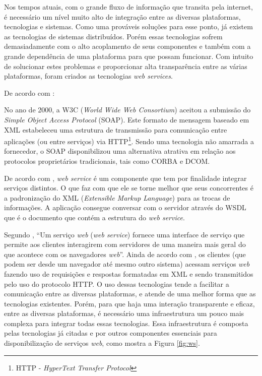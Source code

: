 	
	\par Nos tempos atuais, com o grande fluxo de informação que transita pela
internet, é necessário um nível muito alto de integração entre as diversas
plataformas, tecnologias e sistemas. Como uma prováveis soluções para esse
ponto, já existem as tecnologias de sistemas distribuídos. Porém essas tecnologias
sofrem demasiadamente com o alto acoplamento de seus componentes e também com a
grande dependência de uma plataforma para que possam funcionar. Com intuito de
solucionar estes problemas e proporcionar alta transparência entre as várias
plataformas, foram criados as tecnologias \textit{web services}.
	
	
	\par De acordo com :
	\begin{citacao}
		No ano de 2000, a W3C (\textit{World Wide Web Consortium}) aceitou a submissão
		do \textit{Simple Object Access Protocol} (SOAP). Este formato de mensagem
		baseado em XML estabeleceu uma estrutura de transmissão para comunicação entre
		aplicações (ou entre serviços) via HTTP\footnote{HTTP - \textit{HyperText
		Transfer Protocol}}. Sendo uma tecnologia não amarrada a fornecedor, o SOAP
		disponibilizou uma alternativa atrativa em relação aos protocolos
		proprietários tradicionais, tais como CORBA e DCOM.
	\end{citacao}
	
	\par De acordo com , \textit{web service} é um
componente que tem por finalidade integrar serviços distintos. O que faz com
que ele se torne melhor que seus concorrentes é a padronização do XML
(\textit{Extensible Markup Language}) para as trocas de informações. A
aplicação consegue conversar com o servidor através do  WSDL que é o documento
que contém a estrutura do \textit{web service}.
	
	\par Segundo , “Um serviço \textit{web} (\textit{web
service}) fornece uma interface de serviço que permite aos clientes interagirem
com servidores de uma maneira mais geral do que acontece com os navegadores
\textit{web}”. Ainda de acordo com , os clientes (que
podem ser desde um navegador até mesmo outro sistema) acessam serviços 
\textit{web} fazendo uso de requisições e respostas formatadas em XML e sendo
transmitidos pelo uso do protocolo HTTP. O uso dessas tecnologias tende a
facilitar a comunicação entre as diversas plataformas, e atende de uma
melhor forma que as tecnologias existentes. Porém, para que haja uma
interação transparente e eficaz, entre as diversas plataformas, é necessário uma
infraestrutura um pouco mais complexa para integrar todas essas tecnologias.
Essa infraestrutura é composta pelas tecnologias já citadas e por outros
componentes essenciais para disponibilização de serviços \textit{web}, como
mostra a Figura \ref{fig:ws}.

